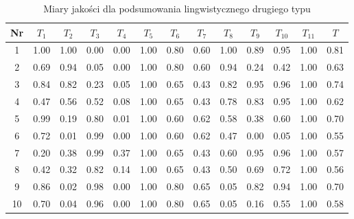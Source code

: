 \documentclass{article}
\begin{document}
    \begin{table}[h!]
    \centering
    \begin{tabular}{|c|c|c|c|c|c|c|c|c|c|c|c|c|}
    \hline
    \textbf{Nr} & \textbf{\(T_1\)} &\textbf{\(T_2\)} & \textbf{\(T_3\)} & \textbf{\(T_4\)} & \textbf{\(T_5\)} & \textbf{\(T_6\)} & \textbf{\(T_7\)} & \textbf{\(T_8\)} & \textbf{\(T_9\)} & \textbf{\(T_{10}\)} & \textbf{\(T_{11}\)} & \textbf{\(T\)}\\
    \hline
    1 & 1.00 & 1.00 & 0.00 & 0.00 & 1.00 & 0.80 & 0.60 & 1.00 & 0.89 & 0.95 & 1.00 & 0.81 \\
    \hline
    2 & 0.69 & 0.94 & 0.05 & 0.00 & 1.00 & 0.80 & 0.60 & 0.94 & 0.24 & 0.42 & 1.00 & 0.63 \\
    \hline
    3 & 0.84 & 0.82 & 0.23 & 0.05 & 1.00 & 0.65 & 0.43 & 0.82 & 0.95 & 0.96 & 1.00 & 0.74 \\
    \hline
    4 & 0.47 & 0.56 & 0.52 & 0.08 & 1.00 & 0.65 & 0.43 & 0.78 & 0.83 & 0.95 & 1.00 & 0.62 \\
    \hline
    5 & 0.99 & 0.19 & 0.80 & 0.01 & 1.00 & 0.60 & 0.62 & 0.58 & 0.38 & 0.60 & 1.00 & 0.70 \\
    \hline
    6 & 0.72 & 0.01 & 0.99 & 0.00 & 1.00 & 0.60 & 0.62 & 0.47 & 0.00 & 0.05 & 1.00 & 0.55 \\
    \hline
    7 & 0.20 & 0.38 & 0.99 & 0.37 & 1.00 & 0.65 & 0.43 & 0.60 & 0.95 & 0.96 & 1.00 & 0.57 \\
    \hline
    8 & 0.42 & 0.32 & 0.82 & 0.14 & 1.00 & 0.65 & 0.43 & 0.50 & 0.69 & 0.72 & 1.00 & 0.56 \\
    \hline
    9 & 0.86 & 0.02 & 0.98 & 0.00 & 1.00 & 0.80 & 0.65 & 0.05 & 0.82 & 0.94 & 1.00 & 0.70 \\
    \hline
    10 & 0.70 & 0.04 & 0.96 & 0.00 & 1.00 & 0.80 & 0.65 & 0.05 & 0.16 & 0.55 & 1.00 & 0.58 \\
    \hline
    \end{tabular}
    \caption{Miary jakości dla podsumowania lingwistycznego drugiego typu}
    \end{table}
\end{document}
